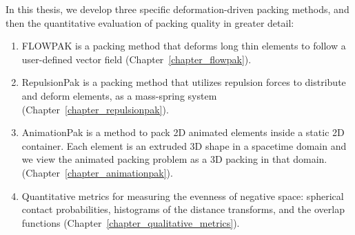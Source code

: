 \newtext
{
In this thesis, we develop three specific deformation-driven packing methods, 
and then  the quantitative evaluation of packing quality in greater detail:
\begin{enumerate}
\item FLOWPAK is a packing method that deforms long thin elements to follow a user-defined vector field (Chapter~\ref{chapter_flowpak}).
\item RepulsionPak is a packing method that utilizes repulsion forces to distribute and deform elements,
	 as a mass-spring system (Chapter~\ref{chapter_repulsionpak}).
\item AnimationPak is a method to pack 2D animated elements inside a static 2D container. 
	Each element is an extruded 3D shape in a spacetime domain 
	and we view the animated packing problem as a 3D packing in that domain.
	(Chapter~\ref{chapter_animationpak}). 
\item  Quantitative metrics for measuring the evenness of negative space: spherical contact probabilities,
histograms of the distance transforms, and the overlap functions (Chapter~\ref{chapter_qualitative_metrics}). 
\end{enumerate}
}




